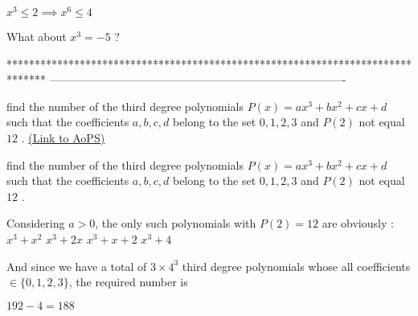 \begin{solution}
	\begin{tcolorbox}$x^3\leq 2\implies x^6\leq 4$\end{tcolorbox}
What about $x^3=-5$ ?
\end{solution}






*******************************************************************************
-------------------------------------------------------------------------------

\begin{problem}
	find the number of the third degree polynomials $P(x) = ax^3 + bx^2 + cx + d$ such that the coefficients $a,b,c,d$ belong to the set ${0,1,2,3}$ and $P(2)$ not equal $12$ .
	\flushright \href{https://artofproblemsolving.com/community/c6h463583}{(Link to AoPS)}
\end{problem}



\begin{solution}
	\begin{tcolorbox}find the number of the third degree polynomials $P(x) = ax^3 + bx^2 + cx + d$ such that the coefficients $a,b,c,d$ belong to the set ${0,1,2,3}$ and $P(2)$ not equal $12$ .\end{tcolorbox}
Considering $a>0$, the only such polynomials with $P(2)=12$ are obviously :
$x^3+x^2$
$x^3+2x$
$x^3+x+2$
$x^3+4$

And since we have a total of $3\times 4^3$ third degree polynomials whose all coefficients $\in\{0,1,2,3\}$, the required number is

$192-4=\boxed{188}$
\end{solution}



